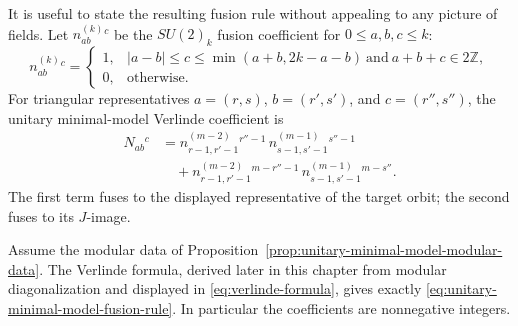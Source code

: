 It is useful to state the resulting fusion rule without appealing to any
picture of fields.  Let \(n^{(k)}_{ab}{}^c\) be the \(SU(2)_k\) fusion
coefficient for \(0\le a,b,c\le k\):
\[
  n^{(k)}_{ab}{}^c=
  \begin{cases}
    1,& |a-b|\le c\le \min(a+b,2k-a-b)\ \text{and}\ a+b+c\in2\mathbb Z,\\
    0,& \text{otherwise}.
  \end{cases}
\]
For triangular representatives \(a=(r,s)\), \(b=(r',s')\), and
\(c=(r'',s'')\), the unitary minimal-model Verlinde coefficient is
\begin{equation}
\begin{split}
  N_{ab}{}^c
  &=
  n^{(m-2)}_{r-1,r'-1}{}^{r''-1}\,
  n^{(m-1)}_{s-1,s'-1}{}^{s''-1}
\\
  &\quad+
  n^{(m-2)}_{r-1,r'-1}{}^{m-r''-1}\,
  n^{(m-1)}_{s-1,s'-1}{}^{m-s''}.
\end{split}
  \label{eq:unitary-minimal-model-fusion-rule}
\end{equation}
The first term fuses to the displayed representative of the target orbit; the
second fuses to its \(J\)-image.

\begin{proposition}
\label{prop:unitary-minimal-model-fusion-check}
Assume the modular data of
Proposition~\ref{prop:unitary-minimal-model-modular-data}.  The Verlinde formula,
derived later in this chapter from modular diagonalization and displayed in
\eqref{eq:verlinde-formula}, gives exactly
\eqref{eq:unitary-minimal-model-fusion-rule}.  In particular the coefficients
are nonnegative integers.
\end{proposition}

